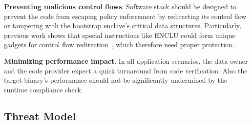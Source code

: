     
   
\vspace{3pt}\noindent\textbf{Preventing malicious control flows}.\label{challenge-cfi} 
Software stack should be designed to prevent the code from escaping policy enforcement by redirecting its control flow or tampering with the bootstrap enclave's critical data structures. Particularly, previous work shows that special instructions like ENCLU could form unique gadgets for control flow redirection~\cite{biondo2018guard}, which therefore need proper protection. 

\vspace{3pt}\noindent\textbf{Minimizing performance impact}.\label{challenge-perf} In all application scenarios, the data owner and the code provider expect a quick turnaround from code verification. Also the target binary's performance should not be significantly undermined by the runtime compliance check. 




\subsection{Threat Model}
\label{subsec-threat}

